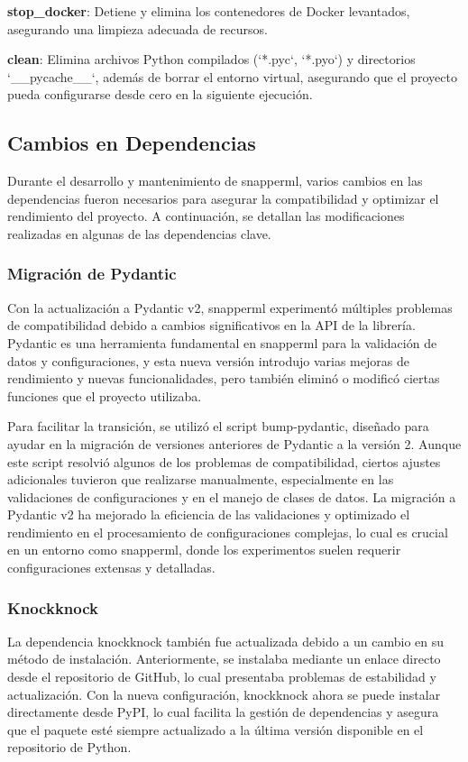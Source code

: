 \vspace{2.5mm}

\textbf{stop\_docker}: Detiene y elimina los contenedores de Docker levantados, asegurando una limpieza adecuada de recursos.

\vspace{2.5mm}

\textbf{clean}: Elimina archivos Python compilados (`*.pyc`, `*.pyo`) y directorios `\_\_pycache\_\_`, además de borrar el entorno virtual, asegurando que el proyecto pueda configurarse desde cero en la siguiente ejecución.

\subsection{Cambios en Dependencias}
Durante el desarrollo y mantenimiento de \Gls{snapperml}, varios cambios en las dependencias fueron necesarios para asegurar la compatibilidad y optimizar el rendimiento del proyecto. A continuación, se detallan las modificaciones realizadas en algunas de las dependencias clave.

\subsubsection{Migración de Pydantic}
Con la actualización a Pydantic v2, \Gls{snapperml} experimentó múltiples problemas de compatibilidad debido a cambios significativos en la API de la librería. Pydantic es una herramienta fundamental en \Gls{snapperml} para la validación de datos y configuraciones, y esta nueva versión introdujo varias mejoras de rendimiento y nuevas funcionalidades, pero también eliminó o modificó ciertas funciones que el proyecto utilizaba.

Para facilitar la transición, se utilizó el script bump-pydantic, diseñado para ayudar en la migración de versiones anteriores de Pydantic a la versión 2. Aunque este script resolvió algunos de los problemas de compatibilidad, ciertos ajustes adicionales tuvieron que realizarse manualmente, especialmente en las validaciones de configuraciones y en el manejo de clases de datos. La migración a Pydantic v2 ha mejorado la eficiencia de las validaciones y optimizado el rendimiento en el procesamiento de configuraciones complejas, lo cual es crucial en un entorno como \Gls{snapperml}, donde los experimentos suelen requerir configuraciones extensas y detalladas.



\subsubsection{Knockknock}
La dependencia knockknock también fue actualizada debido a un cambio en su método de instalación. Anteriormente, se instalaba mediante un enlace directo desde el repositorio de GitHub, lo cual presentaba problemas de estabilidad y actualización. Con la nueva configuración, knockknock ahora se puede instalar directamente desde PyPI, lo cual facilita la gestión de dependencias y asegura que el paquete esté siempre actualizado a la última versión disponible en el repositorio de Python.

